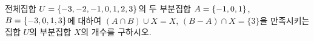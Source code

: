 전체집합 $U=\{-3{,}\mkern3mu\mathopen{}-2{,}\mkern3mu\mathopen{}-1{,}\mkern3mu\mathopen{}0{,}\mkern3mu\mathopen{}1{,}\mkern3mu\mathopen{}2{,}\mkern3mu\mathopen{}3\}$의 두 부분집합 $A=\{-1{,}\mkern3mu\mathopen{}0{,}\mkern3mu\mathopen{}1\}$, $B=\{-3{,}\mkern3mu\mathopen{}0{,}\mkern3mu\mathopen{}1{,}\mkern3mu\mathopen{}3\}$에 대하여 $(A\cap B)\cup X=X$, $(B-A)\cap X=\{3\}$을 만족시키는 집합 $U$의 부분집합 $X$의 개수를 구하시오.
